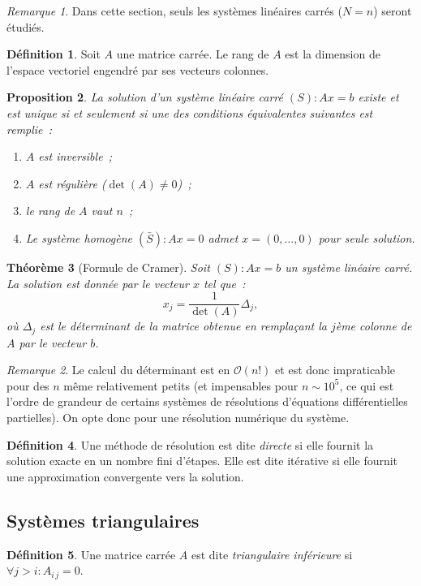 \documentclass{article}
\newtheorem{thm}{Théorème}[section]
\newtheorem{prp}[thm]{Proposition}
\theoremstyle{definition}
\newtheorem{déf}[thm]{Définition}
\theoremstyle{remark}
\newtheorem*{rmq}{Remarque}
\begin{document}
		\begin{rmq} Dans cette section, seuls les systèmes linéaires carrés ($N = n$) seront étudiés. \end{rmq}

		\begin{déf} Soit $A$ une matrice carrée. Le rang de $A$ est la dimension de l'espace vectoriel engendré par ses vecteurs colonnes. \end{déf}

		\begin{prp} La solution d'un système linéaire carré $(S) : Ax = b$ existe et est unique si et seulement si une des conditions équivalentes suivantes
		est remplie~:
		\begin{enumerate}
			\item $A$ est inversible~;
			\item $A$ est régulière ($\det(A) \neq 0$)~;
			\item le rang de $A$ vaut $n$~;
			\item Le système homogène $(\bar S) : Ax = 0$ admet $x = (0, \dotsc, 0)$ pour seule solution.
		\end{enumerate}
		\end{prp}

		\begin{thm}[Formule de Cramer] Soit $(S) : Ax = b$ un système linéaire carré. La solution est donnée par le vecteur $x$ tel que~:
		\[x_j = \frac 1{\det(A)}\Delta_j,\]
		où $\Delta_j$ est le déterminant de la matrice obtenue en remplaçant la $j$ème colonne de $A$ par le vecteur $b$.
		\end{thm}

		\begin{rmq} Le calcul du déterminant est en $\mathcal O(n!)$ et est donc impraticable pour des $n$ même relativement petits (et impensables pour
		$n \sim 10^5$, ce qui est l'ordre de grandeur de certains systèmes de résolutions d'équations différentielles partielles). On opte donc pour une
		résolution numérique du système.
		\end{rmq}

		\begin{déf} Une méthode de résolution est dite \emph{directe} si elle fournit la solution exacte en un nombre fini d'étapes. Elle est dite itérative
		si elle fournit une approximation convergente vers la solution.
		\end{déf}

	\subsection{Systèmes triangulaires}
		\begin{déf} Une matrice carrée $A$ est dite \emph{triangulaire inférieure} si $\forall j > i : A_{i\,j} = 0$. \end{déf}
\end{document}

